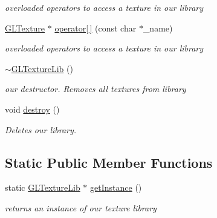 \begin{DoxyCompactItemize}
\begin{DoxyCompactList}\small\item\em overloaded operators to access a texture in our library \end{DoxyCompactList}\item 
\hypertarget{class_g_l_texture_lib_ab4ab9d6def1eb2acecfbe062686ab98e}{\hyperlink{class_g_l_texture}{G\-L\-Texture} $\ast$ \hyperlink{class_g_l_texture_lib_ab4ab9d6def1eb2acecfbe062686ab98e}{operator\mbox{[}$\,$\mbox{]}} (const char $\ast$\-\_\-name)}\label{class_g_l_texture_lib_ab4ab9d6def1eb2acecfbe062686ab98e}

\begin{DoxyCompactList}\small\item\em overloaded operators to access a texture in our library \end{DoxyCompactList}\item 
\hypertarget{class_g_l_texture_lib_aca4b2bd67c1af5b5c1ea304fe2622eac}{\hyperlink{class_g_l_texture_lib_aca4b2bd67c1af5b5c1ea304fe2622eac}{$\sim$\-G\-L\-Texture\-Lib} ()}\label{class_g_l_texture_lib_aca4b2bd67c1af5b5c1ea304fe2622eac}

\begin{DoxyCompactList}\small\item\em our destructor. Removes all textures from library \end{DoxyCompactList}\item 
\hypertarget{class_g_l_texture_lib_a49ba9410297b15f1f2988369853c108f}{void \hyperlink{class_g_l_texture_lib_a49ba9410297b15f1f2988369853c108f}{destroy} ()}\label{class_g_l_texture_lib_a49ba9410297b15f1f2988369853c108f}

\begin{DoxyCompactList}\small\item\em Deletes our library. \end{DoxyCompactList}\end{DoxyCompactItemize}
\subsection*{Static Public Member Functions}
\begin{DoxyCompactItemize}
\item 
\hypertarget{class_g_l_texture_lib_aedb1360fe37f369eb290f773dbada309}{static \hyperlink{class_g_l_texture_lib}{G\-L\-Texture\-Lib} $\ast$ \hyperlink{class_g_l_texture_lib_aedb1360fe37f369eb290f773dbada309}{get\-Instance} ()}\label{class_g_l_texture_lib_aedb1360fe37f369eb290f773dbada309}

\begin{DoxyCompactList}\small\item\em returns an instance of our texture library \end{DoxyCompactList}\end{DoxyCompactItemize}


